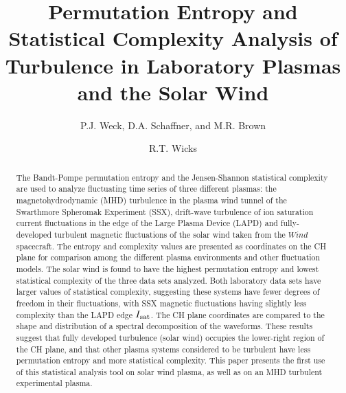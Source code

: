 \documentclass[aps,pre,twocolumn,secnumarabic,nobalancelastpage,amsmath,amssymb,
nofootinbib]{revtex4-1}
\begin{document}
\title{Permutation Entropy and Statistical Complexity Analysis of Turbulence in Laboratory Plasmas and the Solar Wind}
\author{P.J. Weck, D.A. Schaffner, and M.R. Brown}
\author{R.T. Wicks}
\begin{abstract}
The Bandt-Pompe permutation entropy and the Jensen-Shannon statistical complexity are used to analyze fluctuating time series of three different plasmas: the magnetohydrodynamic (MHD) turbulence in the plasma wind tunnel of the Swarthmore Spheromak Experiment (SSX), drift-wave turbulence of ion saturation current fluctuations in the edge of the Large Plasma Device (LAPD) and fully-developed turbulent magnetic fluctuations of the solar wind taken from the $\textit{Wind} $ spacecraft. The entropy and complexity values are presented as coordinates on the CH plane for comparison among the different plasma environments and other fluctuation models. The solar wind is found to have the highest permutation entropy and lowest statistical complexity of the three data sets analyzed. Both laboratory data sets have larger values of statistical complexity, suggesting these systems have fewer degrees of freedom in their fluctuations, with SSX magnetic fluctuations having slightly less complexity than the LAPD edge $I_{\rm sat}$. The CH plane coordinates are compared to the shape and distribution of a spectral decomposition of the waveforms. These results suggest that fully developed turbulence (solar wind) occupies the lower-right region of the CH plane, and that other plasma systems considered to be turbulent have less permutation entropy and more statistical complexity. This paper presents the first use of this statistical analysis tool on solar wind plasma, as well as on an MHD turbulent experimental plasma.
\end{abstract}
\maketitle
\end{document}
